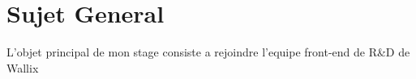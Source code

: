 \documentclass[a4paper, 11pt, french]{report}
\begin{document}
                                                                                                                                        \newpage
                                                                                                                                          \section*{Sujet
                                                                                                                                          General}
                                                                                                                                              L'objet
                                                                                                                                              principal
                                                                                                                                              de
                                                                                                                                              mon
                                                                                                                                              stage
                                                                                                                                              consiste
                                                                                                                                              a
                                                                                                                                              rejoindre
                                                                                                                                              l'equipe
                                                                                                                                              front-end
                                                                                                                                              de
                                                                                                                                              R\&D
                                                                                                                                              de
                                                                                                                                              Wallix
\end{document}
